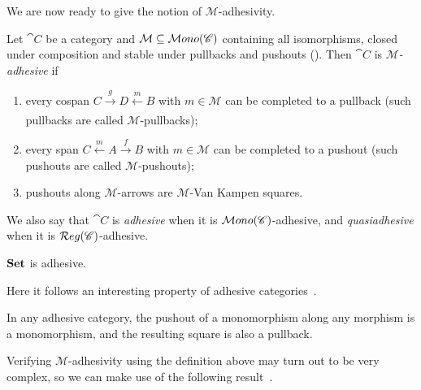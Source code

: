 We are now ready to give the notion of $\mathcal M$-adhesivity. %

\begin{definition}\label{def:adh}
    Let $\cat C$ be a category and $\mathcal M \subseteq \mathcal{M}ono(\mathscr{C})$ containing all isomorphisms, closed under composition and stable under pullbacks and pushouts ().
    Then $\cat C$ is \emph{$\mathcal M$-adhesive} if
    \begin{enumerate}
        \item every cospan $C \xrightarrow[]{g} D \xleftarrow[]{m} B$ with $m \in \mathcal M$ can be completed to a pullback (such pullbacks are called $\mathcal M$-pullbacks);
        \item every span $C \xleftarrow{m} A \xrightarrow{f} B$ with $ m \in \mathcal M$ can be completed to a pushout (such pushouts are called $\mathcal M$-pushouts);
        \item pushouts along $\mathcal M$-arrows are $\mathcal M$-Van Kampen squares.
    \end{enumerate}
    We also say that $\cat C$ is \emph{adhesive} when it is $\mathcal{M}ono(\mathscr{C})$-adhesive, and \emph{quasiadhesive} when it is $\mathcal{R}eg(\mathscr{C})$-adhesive. 
\end{definition}

\begin{obs}
    $\mathbf{Set}$ is adhesive.
\end{obs}

Here it follows an interesting property of adhesive categories~\cite{lack2011embeddingtheoremadhesivecategories}.

\begin{prop}\label{prop:monos_are_preserved_by_pullbacks_in_adh_cats}
    In any adhesive category, the pushout of a monomorphism along any morphism is a monomorphism, and the resulting square is also a pullback. 
\end{prop}

Verifying $\mathcal M$-adhesivity using the definition above may turn out to be very complex, so we can make use of the following result~\cite{castelnovo2022newcriterionmathcalmmathcalnadhesivity}. 


